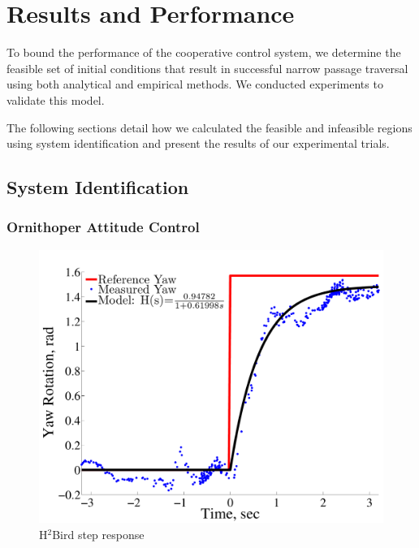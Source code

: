 \documentclass{aamas2013}
\begin{document}

\section{Results and Performance}
\label{sec:performance}
To bound the performance of the cooperative control system, we determine 
the feasible set of initial conditions that result in successful narrow 
passage traversal using both analytical and empirical methods. We conducted 
experiments to validate this model.

The following sections detail how we calculated the feasible and infeasible
regions using system identification and present the results of our
experimental trials.

\subsection{System Identification}

\subsubsection{Ornithoper Attitude Control}
\label{sec:flight_control}
\begin{figure}[tb]
\centering
\includegraphics[width=\linewidth]{figures/step_response_total.pdf}
\caption{H$^2$Bird step response}
\label{fig:step_response}
\end{figure}
\end{document}
